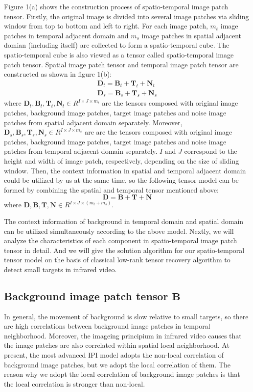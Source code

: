 \documentclass[journal]{IEEEtran}
\begin{document}
Figure 1(a) shows the construction process of spatio-temporal image patch tensor. Firstly, the original image is divided into several image patches via sliding window from top to bottom and left to right. For each image patch, $m_t$ image patches in temporal adjacent domain and $m_s$ image patches in spatial adjacent domian (including itself) are collected to form a spatio-temporal cube. The spatio-temporal cube is also viewed as a tensor called spatio-temporal image patch tensor. Spatial image patch tensor and temporal image patch tensor are constructed 
as shown in figure 1(b):
\begin{equation}
  \begin{split}
    \bm{D}_t = \bm{B}_t + \bm{T}_t + \bm{N}_t \\
    \bm{D}_s = \bm{B}_s + \bm{T}_s + \bm{N}_s
  \end{split}
\end{equation}
where $\bm{D}_t,\bm{B}_t,\bm{T}_t,\bm{N}_t \in R^{{I}\times{J}\times{m_t}}$ are the tensors composed with original image patches, background image patches, target image patches and noise image patches from spatial adjacent domain separately. Moreover, $\bm{D}_s,\bm{B}_s,\bm{T}_s,\bm{N}_s \in R^{{I}\times{J}\times{m_s}}$ are are the tensors composed with original image patches, background image patches, target image patches and noise image patches from temporal adjacent domain separately. $I\text{ and }J$ correspond to the height and width of image patch, respectively, depending on the size of sliding window. Then, the context information in spatial and temporal adjacent domain could be utilized by us at the same time, so the following tensor model can be formed by combining the spatial and temporal tensor mentioned above:
\begin{equation}
  \bm{D}=\bm{B}+\bm{T}+\bm{N}
\end{equation}
where $\bm{D},\bm{B},\bm{T},\bm{N} \in R^{{I}\times{J}\times{(m_t+m_s)}}$.

The context information of background in temporal domain and spatial domain can be utilized simultaneously according to the above model. Nextly, we will analyze the characteristics of each component in spatio-temporal image patch tensor in detail. And we will give the solution algorithm for our spatio-temporal tensor model on the basis of classical low-rank tensor recovery algorithm to detect small targets in infrared video.

\subsection{Background image patch tensor $\mathbf{B}$ }
In general, the movement of background is slow relative to small targets, so there are high correlations between background image patches in temporal neighborhood. Moreover, the imageing principium in infrared video causes that the image patches are also correlated within spatial local neighborhood. At present, the most advanced IPI\cite{gao2013infrared} model adopts the non-local correlation of background image patches, but we adopt the local correlation of them. The reason why we adopt the local correlation of background image patches is that the local correlation is stronger than non-local.
\end{document}
